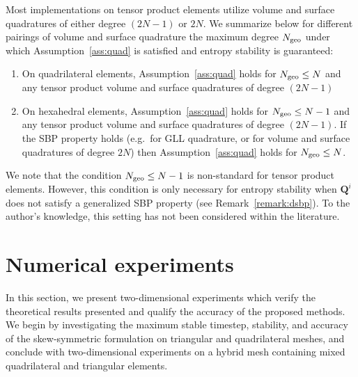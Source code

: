 \documentclass{svjour3}                     %
\begin{document}
Most implementations on tensor product elements utilize volume and surface quadratures of either degree $(2N-1)$ or $2N$.  We summarize below for different pairings of volume and surface quadrature the maximum degree $N_{\rm geo}$ under which Assumption~\ref{ass:quad} is satisfied and entropy stability is guaranteed:
\begin{enumerate}
\item On quadrilateral elements, Assumption~\ref{ass:quad} holds for $N_{\rm geo} \leq N$ and any tensor product volume and surface quadratures of degree $(2N-1)$ 
\item On hexahedral elements, Assumption~\ref{ass:quad} holds for $N_{\rm geo} \leq N-1$ and any tensor product volume and surface quadratures of degree $(2N-1)$.  If the SBP property holds (e.g.\ for GLL quadrature, or for volume and surface quadratures of degree $2N$) then Assumption~\ref{ass:quad} holds for $N_{\rm geo} \leq N$.
\end{enumerate}

We note that the condition $N_{\rm geo} \leq N-1$ is non-standard for tensor product elements.  However, this condition is only necessary for entropy stability when $\bm{Q}^i$ does not satisfy a generalized SBP property (see Remark~\ref{remark:dsbp}).  To the author's knowledge, this setting has not been considered within the literature.


\section{Numerical experiments}
\label{sec:num}

In this section, we present two-dimensional experiments which verify the theoretical results presented and qualify the accuracy of the proposed methods.  We begin by investigating the maximum stable timestep, stability, and accuracy of the skew-symmetric formulation on triangular and quadrilateral meshes, and conclude with two-dimensional experiments on a hybrid mesh containing mixed quadrilateral and triangular elements.  
\end{document}
